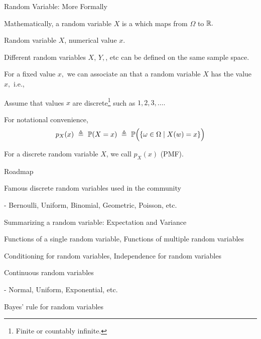 \documentclass[fleqn,aspectratio=169]{beamer}
\begin{document}
\begin{frame}{Random Variable: More Formally}

\plitemsep 0.1in

\bci [$\circ$]
\item<2-> Mathematically, a random variable $X$ is a  which maps from $\Omega$ to ${\mathbb R}.$

\item<4->  Random variable $X$, numerical value $x.$

\item<5-> Different random variables $X$, $Y,$, etc can be defined on the same sample space. 

\item<6-> For a fixed value $x,$ we can associate an  that a random variable $X$ has the value $x,$ i.e., 

\item<8-> Assume that values $x$ are discrete\footnote{Finite or countably infinite.} such as $1, 2, 3, \ldots.$

For notational convenience,  
$$
p_X(x) \ \eqdef \ \cprob{X = x} \ \eqdef \ \cbprob{\{ \omega \in \Omega \mid X(w) = x \}} 
$$

\item<9-> For a discrete random variable $X$, we call $p_X(x)$  (PMF).

\eci 

\end{frame}

\begin{frame}{Roadmap}

\plitemsep 0.1in

\bci 
\item Famous discrete random variables used in the community

- Bernoulli, Uniform, Binomial, Geometric, Poisson, etc. 

\item Summarizing a random variable: Expectation and Variance

\item Functions of a single random variable, Functions of multiple random variables 

\item Conditioning for random variables, Independence for random variables 

\item Continuous random variables

- Normal, Uniform, Exponential, etc. 

\item Bayes' rule for random variables
\eci 

\end{frame}
\end{document}
